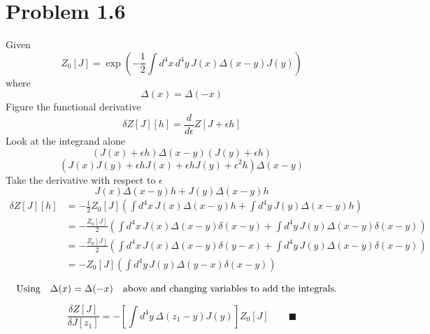 \documentclass{amsart}
\begin{document}
\section*{Problem 1.6}
Given \[Z_0[J]=\exp\left(-\frac{1}{2}\int d^4 x\, d^4 y\, J(x) \Delta(x-y) J(y)\right)\]
where \[\Delta(x)=\Delta(-x)\]
Figure the functional derivative
\[\delta Z[J][h]=\frac{d}{d\epsilon}Z[J+\epsilon h]\]
Look at the integrand alone
\[(J(x)+\epsilon h) \Delta(x-y) (J(y)+\epsilon h)\]
\[(J(x)J(y)+\epsilon h J(x)+\epsilon h J(y)+\epsilon^2 h) \Delta(x-y)\]
Take the derivative with respect to $\epsilon$
\[J(x) \Delta(x-y)h + J(y) \Delta(x-y)h\]
\begin{align*}
    \delta Z[J][h] & =-\frac{1}{2}Z_0[J]\left(\int d^4 x\,  J(x) \Delta(x-y)h +\int d^4 y\,J(y) \Delta(x-y)h\right)                    \\
                   & =-\frac{Z_0[J]}{2}\left(\int d^4 x\,  J(x) \Delta(x-y)\delta(x-y) +\int d^4 y\,J(y) \Delta(x-y)\delta(x-y)\right) \\
                   & =-\frac{Z_0[J]}{2}\left(\int d^4 x\,  J(x) \Delta(x-y)\delta(y-x) +\int d^4 y\,J(y) \Delta(x-y)\delta(x-y)\right) \\
                   & =-Z_0[J]\left(\int d^4 y\,J(y) \Delta(y-x)\delta(x-y)\right)                                                      \\
\end{align*}
\[\qq*{Using}\Delta(x)=\Delta(-x)\qq{above and changing variables to add the integrals.}\]

\[\frac{\delta Z[J]}{\delta J[z_1]}=-\left[\int d^4 y\, \Delta(z_1-y)J(y)\right]Z_0[J] \qquad \blacksquare\]
\end{document}
